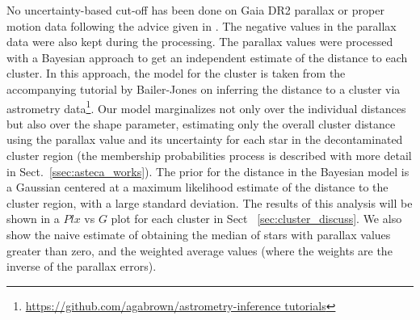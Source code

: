 \documentclass[draft]{aa}
\begin{document}
No uncertainty-based cut-off has been done on Gaia DR2 parallax or proper
motion data following the advice given in \cite{Luri_2018}. The negative values
in the parallax data were also kept during the processing. The parallax values
were processed with a Bayesian approach to get an independent estimate of the
distance to each cluster. In this approach, the model for the cluster is
taken from the accompanying tutorial by Bailer-Jones on inferring the distance
to a cluster via astrometry
data\footnote{\url{https://github.com/agabrown/astrometry-inference tutorials}}.
Our model marginalizes not only over the individual distances but also over the
shape parameter, estimating only the overall cluster distance using the
parallax value and its uncertainty for each star in the decontaminated cluster
region (the membership probabilities process is described with more detail in
Sect.~\ref{ssec:asteca_works}). The prior for the distance in the Bayesian
model is a Gaussian centered at a maximum likelihood estimate of the distance
to the cluster region, with a large standard deviation. The results of
this analysis will be shown in a $Plx$ vs $G$ plot for each cluster in Sect~
\ref{sec:cluster_discuss}. We also show the naive estimate of obtaining the
median of stars with parallax values greater than zero, and the weighted
average values (where the weights are the inverse of the parallax errors).

\end{document}
